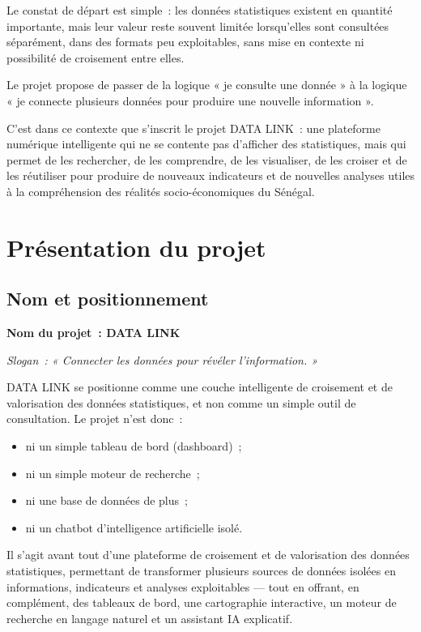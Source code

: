 \documentclass[11pt,a4paper]{article}
\begin{document}
Le constat de départ est simple~: les données statistiques existent en quantité importante, mais leur valeur reste souvent limitée lorsqu'elles sont consultées séparément, dans des formats peu exploitables, sans mise en contexte ni possibilité de croisement entre elles.

\begin{quotebox}
Le projet propose de passer de la logique « je consulte une donnée » à la logique « je connecte plusieurs données pour produire une nouvelle information ».
\end{quotebox}

C'est dans ce contexte que s'inscrit le projet DATA LINK~: une plateforme numérique intelligente qui ne se contente pas d'afficher des statistiques, mais qui permet de les rechercher, de les comprendre, de les visualiser, de les croiser et de les réutiliser pour produire de nouveaux indicateurs et de nouvelles analyses utiles à la compréhension des réalités socio-économiques du Sénégal.

\section{Présentation du projet}

\subsection{Nom et positionnement}

\textbf{Nom du projet~: DATA LINK}

\textit{Slogan~: « Connecter les données pour révéler l'information. »}

DATA LINK se positionne comme une couche intelligente de croisement et de valorisation des données statistiques, et non comme un simple outil de consultation. Le projet n'est donc~:

\begin{itemize}
  \item ni un simple tableau de bord (dashboard)~;
  \item ni un simple moteur de recherche~;
  \item ni une base de données de plus~;
  \item ni un chatbot d'intelligence artificielle isolé.
\end{itemize}

Il s'agit avant tout d'une plateforme de croisement et de valorisation des données statistiques, permettant de transformer plusieurs sources de données isolées en informations, indicateurs et analyses exploitables --- tout en offrant, en complément, des tableaux de bord, une cartographie interactive, un moteur de recherche en langage naturel et un assistant IA explicatif.
\end{document}
